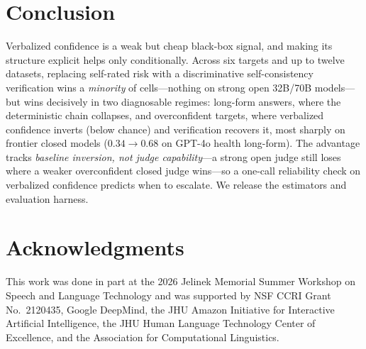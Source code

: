 \documentclass[11pt]{article}
\begin{document}
\section{Conclusion}
Verbalized confidence is a weak but cheap black-box signal, and making its structure explicit
helps only conditionally. Across six targets and up to twelve datasets, replacing self-rated
risk with a discriminative self-consistency verification wins a \emph{minority} of
cells---nothing on strong open 32B/70B models---but wins decisively in two diagnosable regimes:
long-form answers, where the deterministic chain collapses, and overconfident targets, where
verbalized confidence inverts (below chance) and verification recovers it, most sharply on
frontier closed models ($0.34\rightarrow0.68$ on GPT-4o health long-form). The advantage tracks
\emph{baseline inversion, not judge capability}---a strong open judge still loses where a weaker
overconfident closed judge wins---so a one-call reliability check on verbalized confidence
predicts when to escalate. We release the estimators and evaluation harness.

\section*{Acknowledgments}
This work was done in part at the 2026 Jelinek Memorial Summer Workshop on Speech and
Language Technology and was supported by NSF CCRI Grant No.\ 2120435, Google DeepMind, the
JHU Amazon Initiative for Interactive Artificial Intelligence, the JHU Human Language
Technology Center of Excellence, and the Association for Computational Linguistics.




\appendix
\end{document}
